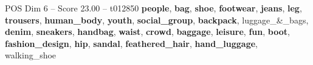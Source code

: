 \begin{textsample}{POS Dim 6 – Score 23.00 – t012850}  \label{ex:f6_pos_002}
\textbf{people}, \textbf{bag}, \textbf{shoe}, \textbf{footwear}, \textbf{jeans}, \textbf{leg}, \textbf{trousers}, \textbf{human\_body}, \textbf{youth}, \textbf{social\_group}, \textbf{backpack}, luggage\_\&\_bags, \textbf{denim}, \textbf{sneakers}, \textbf{handbag}, \textbf{waist}, \textbf{crowd}, \textbf{baggage}, \textbf{leisure}, \textbf{fun}, \textbf{boot}, \textbf{fashion\_design}, \textbf{hip}, \textbf{sandal}, \textbf{feathered\_hair}, \textbf{hand\_luggage}, walking\_shoe

\end{textsample}
